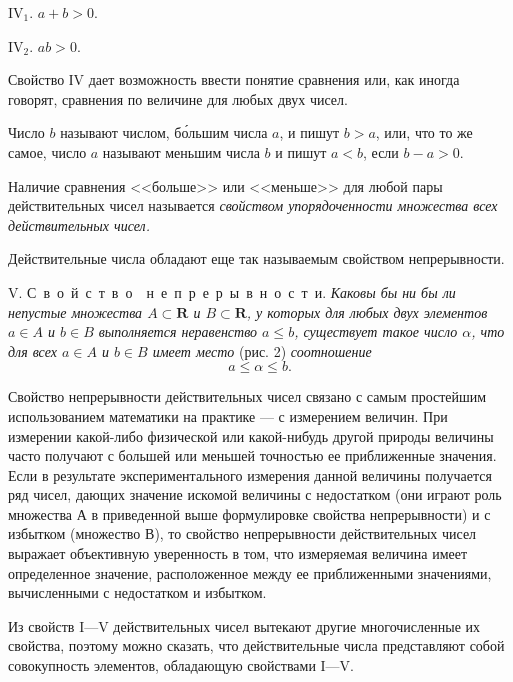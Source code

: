 \documentclass{book}
\begin{document}
\begin{figure}[!h]



\end{figure}

{\fontsize{15,8pt}{18pt}\selectfont
IV$_{1}$. $a + b > 0$.}

{\fontsize{15,8pt}{18pt}\selectfont
IV$_{2}$. $ab > 0$.}

{\fontsize{15,8pt}{18pt}\selectfont
Свойство ІV дает возможность ввести понятие сравнения или, 
как иногда говорят, сравнения по величине для любых двух чисел.}

{\fontsize{15,8pt}{18pt}\selectfont
Число $b$ называют числом, б\'{о}льшим числа $a$, и пишут $b > a$, или, что то же самое, 
число $a$ называют меньшим числа $b$ и пишут $a < b$, если $b - a > 0$.}

{\fontsize{15,8pt}{18pt}\selectfont
Наличие сравнения <<больше>> или <<меньше>> для любой пары действительных чисел 
называется \textit{свойством упорядоченности множества всех действительных чисел.}}

{\fontsize{15,8pt}{18pt}\selectfont
Действительные числа обладают еще так называемым
свойством непрерывности.}

{\fontsize{15,8pt}{18pt}\selectfont
V. С\ в\ о\ й\ с\ т\ в\ о\ \ н\ е\ п\ р\ е\ р\ ы\ в\ н\ о\ с\ т\ и. \textit{Каковы бы ни бы ли непустые множества 
$A\subset\textbf{R}$ и $B\subset\textbf{R}$, у которых для любых двух элементов 
$a\in A$ и $b\in B$ выполняется неравенство $a\leqslant b$, существует такое число $\alpha$, 
что для всех $a\in A$ и $b\in B$ имеет место} (рис. 2) \textit{соотношение}
$$
a\leqslant\alpha\leqslant b.
$$}

{\fontsize{15,8pt}{18pt}\selectfont
Свойство непрерывности действительных чисел связано с самым простейшим 
использованием математики на практике --- с измерением величин. При измерении 
какой-либо физической или какой-нибудь другой природы величины часто получают 
с большей или меньшей точностью ее приближенные значения. Если в результате 
экспериментального измерения данной величины получается ряд чисел, дающих 
значение искомой величины с недостатком (они играют роль множества $А$ в 
приведенной выше формулировке свойства непрерывности) и с избытком (множество $В$), 
то свойство непрерывности действительных чисел выражает объективную уверенность 
в том, что измеряемая величина имеет определенное значение, расположенное между 
ее приближенными значениями, вычисленными с недостатком и избытком.
}

{\fontsize{15,8pt}{18pt}\selectfont
Из свойств I---V действительных чисел вытекают другие многочисленные их свойства, 
поэтому можно сказать, что действительные числа представляют собой совокупность 
элементов, обладающую свойствами I---V.}
\end{document}
